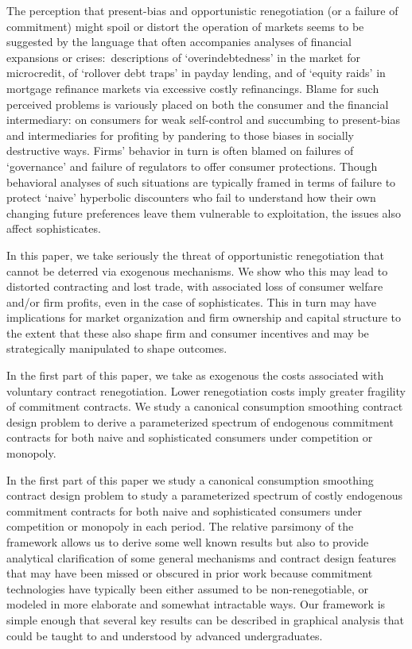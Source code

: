 \documentclass[11pt,english]{article}
\theoremstyle{plain}
\theoremstyle{definition}
\begin{document}
The perception that  present-bias and opportunistic renegotiation (or a failure of commitment) might  spoil or distort the operation of markets seems to be suggested by the language that often accompanies analyses of financial expansions or crises:\ descriptions of `overindebtedness' in the market for microcredit, of `rollover debt traps' in payday lending, and of `equity raids' in mortgage refinance markets via excessive costly refinancings. Blame for such perceived problems is variously placed on both the consumer and  the financial intermediary: on consumers for weak self-control and succumbing to present-bias
and intermediaries for profiting by pandering to those biases in socially destructive ways. Firms' behavior in turn is often blamed on failures of `governance' and  failure of regulators to offer consumer protections. Though behavioral analyses of such situations are typically framed in terms of failure to protect `naive' hyperbolic discounters   who fail to understand how their own changing future preferences  leave them vulnerable to  exploitation, the issues also affect sophisticates. 

In this paper, we take seriously the threat of opportunistic renegotiation that cannot be deterred via exogenous mechanisms. We show who this may lead to distorted contracting and lost trade, with associated loss of consumer welfare and/or firm profits, even in the case of sophisticates. This in turn may have  implications for market organization and firm ownership and capital structure to the extent that these also shape firm and consumer incentives and may be strategically manipulated to shape outcomes.

In the first part of this paper, we take as exogenous the costs associated with voluntary contract renegotiation. Lower renegotiation costs imply greater fragility of commitment contracts. We study a canonical consumption smoothing contract design problem to derive a parameterized spectrum of endogenous commitment contracts for both naive and sophisticated consumers under competition or monopoly.

      

  

  

In the first part of this paper we study a canonical consumption smoothing contract design problem to study a parameterized spectrum of costly endogenous commitment contracts for both naive and sophisticated consumers under competition or monopoly in each period.
The relative parsimony of the framework allows us to derive some well known results but also to provide analytical clarification of some general mechanisms and contract design features that may have  been missed or obscured in prior work
because commitment technologies have typically been either assumed to be non-renegotiable, or modeled in more elaborate and somewhat intractable ways. Our framework  is simple enough that several key results can be described in graphical analysis that could be taught to and understood by advanced undergraduates.
\end{document}
